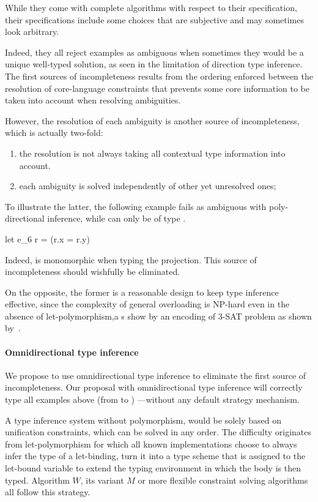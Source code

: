 \documentclass[acmsmall,screen,nonacm]{acmart}
\begin{document}
While they come with complete algorithms with respect to their
specification, their specifications include some choices that are subjective
and may sometimes look arbitrary.

Indeed, they all reject examples as ambiguous when sometimes they would be a
unique well-typed solution, as seen in the limitation of direction type
inference.  The first sources of incompleteness results from the ordering
enforced between the resolution of core-language constraints that prevents
some core information to be taken into account when resolving ambiguities.

However, the resolution of each ambiguity is another source of
incompleteness, which is actually two-fold:
\begin{enumerate}
\item  
  the resolution is not always taking all contextual type information into
  account.  
\item
  each ambiguity is solved independently of other yet unresolved ones;
\end{enumerate}
To illustrate the latter, the following example fails as ambiguous with
poly-directional inference, while  can only be of type
.  
\begin{program}[error]
let e_6 r = (r.x = r.y)
\end{program}
Indeed,  is monomorphic when typing the projection.  This source of
incompleteness should wishfully be eliminated.

On the opposite, the former is a reasonable design to keep type inference
effective, since the complexity of general overloading is NP-hard even in
the absence of let-polymorphism,a s show by an encoding of 3-SAT problem as
shown by~\citet {Chargueraud-Bodin-Dunfield-Riboulet/jfla2025}.


\paragraph{Omnidirectional type inference}

We propose to use omnidirectional type inference to eliminate the first
source of incompleteness.  Our proposal with omnidirectional type inference
will correctly type all examples above (from  to
)\ignorespaces
{}
---without any default strategy mechanism.

A type inference system without polymorphism, would be solely based on
unification constraints, which can be solved in any order.  The difficulty
originates from \ML let-polymorphism for which all known implementations
choose to always infer the type of a let-binding, turn it into a type scheme
that is assigned to the let-bound variable to extend the typing environment
in which the body is then typed. Algorithm $W$, its variant $M$ or more
flexible constraint solving algorithms all follow this strategy.
\end{document}
